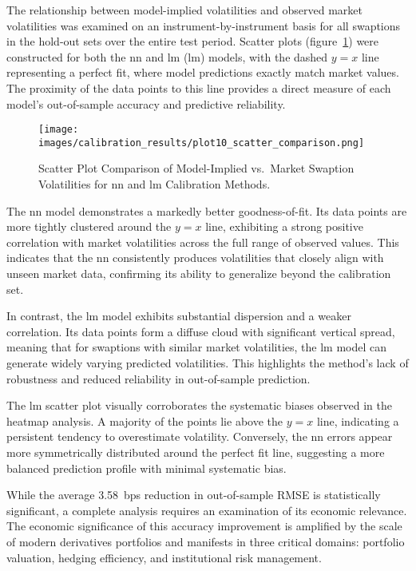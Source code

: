 The relationship between model-implied volatilities and observed market volatilities was examined on an instrument-by-instrument basis for all swaptions in the hold-out sets over the entire test period. Scatter plots (figure~\ref{fig:scatter_comparison}) were constructed for both the \ac{nn} and \ac{lm} (\ac{lm}) models, with the dashed \(y=x\) line representing a perfect fit, where model predictions exactly match market values. The proximity of the data points to this line provides a direct measure of each model's out-of-sample accuracy and predictive reliability.

\begin{figure}[H]
	\centering
	\texttt{[image: images/calibration\_results/plot10\_scatter\_comparison.png]}
	\caption{Scatter Plot Comparison of Model-Implied vs.\ Market Swaption Volatilities for \ac{nn} and \ac{lm} Calibration Methods.}
	\label{fig:scatter_comparison}
\end{figure}

The \ac{nn} model demonstrates a markedly better goodness-of-fit. Its data points are more tightly clustered around the \(y=x\) line, exhibiting a strong positive correlation with market volatilities across the full range of observed values. This indicates that the \ac{nn} consistently produces volatilities that closely align with unseen market data, confirming its ability to generalize beyond the calibration set.

In contrast, the \ac{lm} model exhibits substantial dispersion and a weaker correlation. Its data points form a diffuse cloud with significant vertical spread, meaning that for swaptions with similar market volatilities, the \ac{lm} model can generate widely varying predicted volatilities. This highlights the method's lack of robustness and reduced reliability in out-of-sample prediction.

The \ac{lm} scatter plot visually corroborates the systematic biases observed in the heatmap analysis. A majority of the points lie above the \(y=x\) line, indicating a persistent tendency to overestimate volatility. Conversely, the \ac{nn} errors appear more symmetrically distributed around the perfect fit line, suggesting a more balanced prediction profile with minimal systematic bias.

While the average 3.58~\ac{bps} reduction in out-of-sample RMSE is statistically significant, a complete analysis requires an examination of its economic relevance. The economic significance of this accuracy improvement is amplified by the scale of modern derivatives portfolios and manifests in three critical domains: portfolio valuation, hedging efficiency, and institutional risk management.

